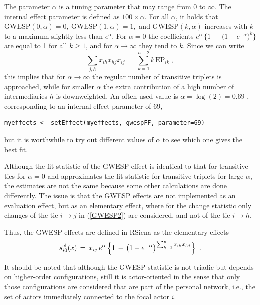 \documentclass[a4paper,fleqn,11pt]{article}
\newcommand{\+}{\, + \,}
\newcommand{\RS}{{\sf RSiena }}
\newcommand{\vit}{\theenumi}
\begin{document}
\begin{enumerate}
The parameter $\alpha$ is a tuning parameter that may range from 0 to $\infty$.
The internal effect parameter is defined as $100 \times \alpha$.
For all $\alpha$, it holds that
$ \text{GWESP}(0, \alpha) = 0,\  \text{GWESP}(1, \alpha) = 1,$
and $\text{GWESP}(k, \alpha) $ increases with $k$ to a maximum
slightly less than $e^\alpha$.
For $\alpha = 0$ the coefficients
$e^{\alpha} \,\big\{1 \,-\, \big(1 - e^{-\alpha}\big)^k\big\} $
are equal to 1 for all $k \geq 1$,
and for $\alpha \rightarrow \infty$ they tend to $k$.
Since we can write
\[
  \sum_{j,h} x_{ih}x_{hj}x_{ij} \,=\, \sum_{k=1}^{n-2} k\, \text{EP}_{ik}   \ ,
\]
this implies that for $\alpha \rightarrow \infty$  the regular number
of transitive triplets is approached, while for smaller $\alpha$
the extra contribution of a high number of intermediaries $h$
is downweighted.
An often used value is $\alpha = \log(2) = 0.69$ \citep{SPRH06},
corresponding to an internal effect parameter of 69,
\begin{verbatim}
myeffects <- setEffect(myeffects, gwespFF, parameter=69)
\end{verbatim}
but it is worthwhile to try out different values of $\alpha$
to see which one gives the best fit.

Although the fit statistic of the GWESP effect is identical to that
for transitive ties for $\alpha=0$ and approximates the fit
statistic for transitive triplets
for large $\alpha$, the estimates are not the same because some other
calculations are done differently. The issue is that the GWESP effects are
not implemented as an evaluation effect, but as an elementary effect,
where for the change statistic only changes of the tie $i \rightarrow j$ in
(\ref{GWESP2}) are considered, and not of the tie $i \rightarrow h$.

Thus, the GWESP effects are defined in \RS as the elementary effects
\begin{equation}
 s^{\rm el}_{i\vit}(x) \,=\,
       x_{ij} \,
                        e^{\alpha} \,\Big\{1 \,-\, \big(1 -
                        e^{-\alpha}\big)^{\sum_{h=1}^n x_{ih}x_{hj} }  \Big\}
      \,   \ .
         \label{GWESP3}
\end{equation}

It should be noted that although the GWESP statistic is not triadic but
depends on higher-order configurations, still it is actor-oriented
in the sense that only those configurations are considered that are part of the
personal network, i.e., the set of actors immediately connected
to the focal actor $i$.


\end{enumerate}
\end{document}
